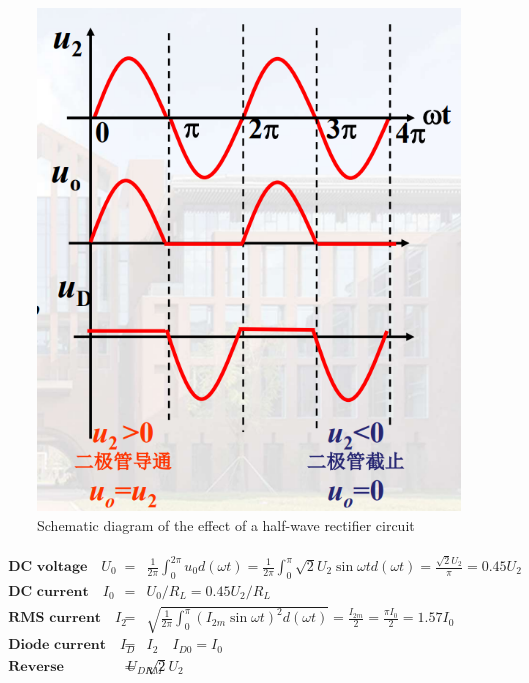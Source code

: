 \documentclass[UTF8]{article}
\begin{document}
    	\begin{figure}[H]
    	    	\centering
    	    	\includegraphics[clip,scale=0.65,trim={0 0 0 0}]{fig/fig6.png}
    	        \caption{Schematic diagram of the effect of a half-wave rectifier circuit}
    	        \label{figure.6}
        \end{figure}
        
    \begin{eqnarray}
    \begin{matrix}
    \textbf{DC voltage} \quad U_{0}&=&\frac{1}{2 \pi} \int_{0}^{2 \pi} u_{0} d(\omega t)=\frac{1}{2 \pi} \int_{0}^{\pi} \sqrt{2} U_{2} \sin \omega t d(\omega t)=\frac{\sqrt{2} U_{2}}{\pi}=0.45 U_{2}\\
    \textbf{DC current} \quad I_{0}&=&U_{0} / R_{L}=0.45 U_{2} / R_{L}\\
    \textbf{RMS current} \quad I_{2}&=&\sqrt{\frac{1}{2 \pi} \int_{0}^{\pi}\left(I_{2 m} \sin \omega t\right)^{2} d(\omega t)}=\frac{I_{2 m}}{2}=\frac{\pi I_{0}}{2}=1.57 I_{0}\\
    \textbf{Diode current} \quad I_{D}&=&I_{2} \quad I_{D 0}=I_{0}\\
    \textbf{Reverse voltage} \quad U_{D R M}&=&\sqrt{2} U_{2}
    \end{matrix}
    \end{eqnarray}
   
\end{document}
